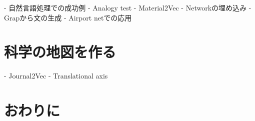 \documentclass[J]{scitrans}
\begin{document}
- 自然言語処理での成功例
    - Analogy test
    - Material2Vec
- Networkの埋め込み
    - Grapから文の生成
- Airport netでの応用

\section{科学の地図を作る}

- Journal2Vec
- Translational axis




\section{おわりに}


\acknowledgement





\end{document}
